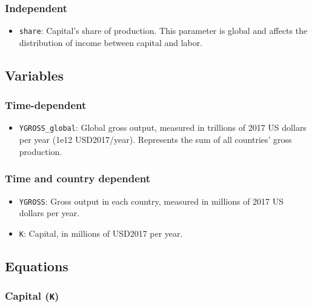 \documentclass[
]{article}
\providecommand{\tightlist}{%
  \setlength{\itemsep}{0pt}\setlength{\parskip}{0pt}}
\begin{document}
\subsubsection{Independent}\label{independent-2}

\begin{itemize}
\tightlist
\item
  \texttt{share}: Capital's share of production. This parameter is
  global and affects the distribution of income between capital and
  labor.
\end{itemize}

\subsection{Variables}\label{variables-3}

\subsubsection{Time-dependent}\label{time-dependent-4}

\begin{itemize}
\tightlist
\item
  \texttt{YGROSS\_global}: Global gross output, measured in trillions of
  2017 US dollars per year (1e12 USD2017/year). Represents the sum of all countries'
  gross production.
\end{itemize}

\subsubsection{Time and country
dependent}\label{time-and-country-dependent-7}

\begin{itemize}
\item
  \texttt{YGROSS}: Gross output in each country, measured in millions of
  2017 US dollars per year.
\item
  \texttt{K}: Capital, in millions of USD2017 per year.
\end{itemize}

\subsection{Equations}\label{equations-3}

\subsubsection{\texorpdfstring{Capital
(\texttt{K})}{Capital (K)}}\label{capital-k}
\end{document}
